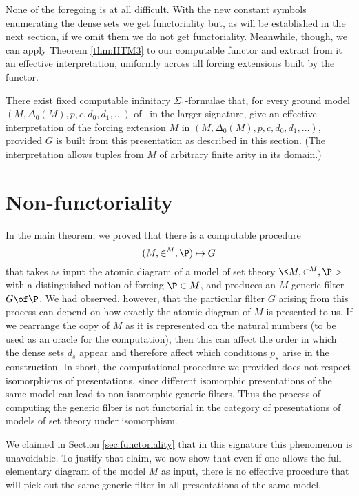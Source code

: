 \documentclass{amsart}
\begin{document}
 None of the foregoing is at all difficult. With the new constant symbols enumerating the dense sets we get functoriality but, as will be established in the next section, if we omit them we do not get functoriality.
 Meanwhile, though, we can apply Theorem \ref{thm:HTM3} to our computable functor and extract
 from it an effective interpretation, uniformly across all forcing extensions built by the functor.
 
 \begin{corollary}
 \label{cor:interpretations}
 There exist fixed computable infinitary $\Sigma_1$-formulae that,
 for every ground model
 $(M, \Delta_0(M),p,c,d_0,d_1,\ldots)$ of \ZFC\ in the larger signature,
 give an effective interpretation of the forcing extension $M$
 in $(M, \Delta_0(M),p,c,d_0,d_1,\ldots)$, provided
 $G$ is built from this presentation as described in this section.
 (The interpretation allows tuples from $M$ of arbitrary finite arity in its domain.)
 \end{corollary}
 
 
 
 \section{Non-functoriality}\label{Section.Non-functoriality}
 
 In the main theorem, we proved that there is a computable procedure
  $$(M,\in^M,\P)\mapsto G$$
 that takes as input the atomic diagram of a model of set theory $\<M,\in^M,\P>$ with a distinguished notion of forcing $\P\in M$, and produces an $M$-generic filter $G\of\P$. We had observed, however, that the particular filter $G$ arising from this process can depend on how exactly the atomic diagram of $M$ is presented to us. If we rearrange the copy of $M$ as it is represented on the natural numbers (to be used as an oracle for the computation), then this can affect the order in which the dense sets $d_s$ appear and therefore affect which conditions $p_s$ arise in the construction. In short, the computational procedure we provided does not respect isomorphisms of presentations, since different isomorphic presentations of the same model can lead to non-isomorphic generic filters. Thus the process of computing the generic filter is not functorial in the category of presentations of models of set theory under isomorphism.
 
 We claimed in Section \ref{sec:functoriality} that in this signature this phenomenon is unavoidable. To justify that claim, we now show that even if one allows the full elementary diagram of the model $M$ as input, there is no effective procedure that will pick out the same generic filter in all presentations of the same model.
 
\end{document}
